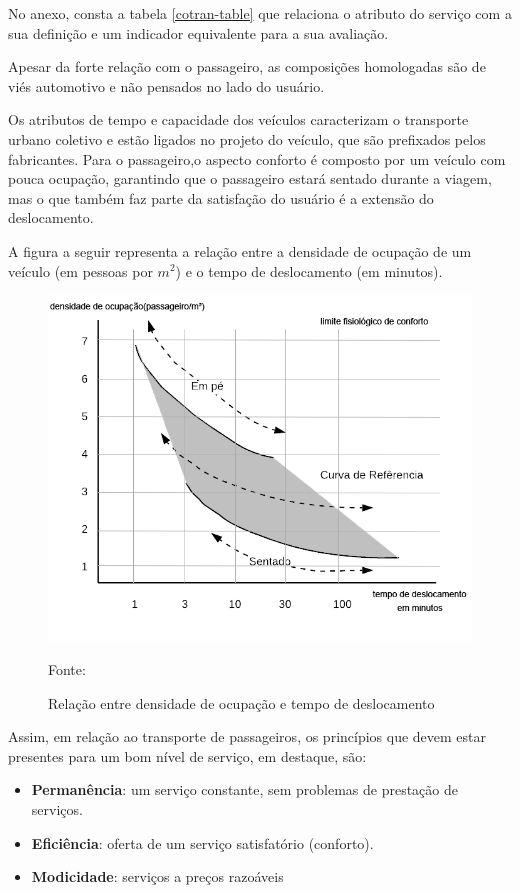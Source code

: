 No anexo, consta a tabela \ref{cotran-table} que 
relaciona o atributo do serviço com a sua definição e um indicador equivalente para a sua avaliação.

Apesar da forte relação com o passageiro, as composições homologadas são de viés automotivo e não pensados no lado do usuário.
 
Os atributos de tempo e capacidade dos veículos caracterizam o transporte urbano coletivo e estão ligados no projeto do veículo, que são prefixados pelos fabricantes. Para o passageiro,o aspecto conforto é composto por um veículo com pouca ocupação, garantindo que o passageiro estará sentado durante a viagem, mas o que também faz parte da satisfação do usuário é a extensão do deslocamento.

A figura a seguir representa a relação entre a densidade de ocupação de um veículo (em pessoas por $m^2$) e o tempo de deslocamento (em minutos).

\begin{figure}[H]
  \centering
  \caption{Relação entre densidade de ocupação e tempo de deslocamento}
 \includegraphics[scale=0.55]{imagens/limite-fisiologico.png} \par
\bigskip
Fonte: \cite[p.307]{MARTINS}
\end{figure}
Assim, em relação ao transporte de passageiros, os princípios que devem estar presentes para um bom nível de serviço, em destaque, são: 
\begin{itemize}
    \item \textbf{Permanência}: um serviço constante, sem problemas de prestação de serviços.
    \item \textbf{Eficiência}: oferta de um serviço satisfatório (conforto).
    \item \textbf{Modicidade}: serviços a preços razoáveis
\end{itemize}

